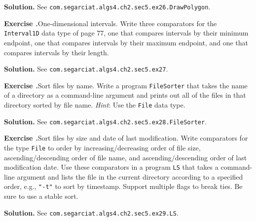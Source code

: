\documentclass[12pt, a4paper]{article}
\newenvironment{ex}[2][Exercise]
{\par\medskip\noindent \textbf{#1 #2.}}
{\medskip}
\newenvironment{sol}[1][Solution]
{\par\medskip\noindent \textbf{#1.} }
{\medskip}
\begin{document}
	\begin{sol}
		See \texttt{com.segarciat.algs4.ch2.sec5.ex26.DrawPolygon}.
	\end{sol}
	\begin{ex}{27}
		\emph{One-dimensional intervals}. Write three comparators for the \texttt{Interval1D}
		data type of page 77, one that compares intervals by their minimum endpoint, one that
		compares intervals by their maximum endpoint, and one that compares intervals by
		their length.
	\end{ex}
	\begin{sol}
		See \texttt{com.segarciat.algs4.ch2.sec5.ex27}.
	\end{sol}
	\begin{ex}{28}
		\emph{Sort files by name}. Write a program \texttt{FileSorter} that takes
		the name of a directory as a command-line argument and prints out all of the files
		in that directory sorted by file name. \emph{Hint}: Use the \texttt{File} data type.
	\end{ex}
	\begin{sol}
		See \texttt{com.segarciat.algs4.ch2.sec5.ex28.FileSorter}.
	\end{sol}
	\begin{ex}{29}
		\emph{Sort files by size and date of last modification}. Write comparators for the
		type \texttt{File} to order by increasing/decreasing order of file size,
		ascending/descending order of file name, and ascending/descending order of last
		modification date. Use these comparators in a program \texttt{LS} that
		takes a command-line argument and lists the file in the current directory according
		to a specified order, e.g., \texttt{"-t"} to sort by timestamp. Support multiple
		flags to break ties. Be sure to use a stable sort.
	\end{ex}
	\begin{sol}
		See \texttt{com.segarciat.algs4.ch2.sec5.ex29.LS}.
	\end{sol}
	\pagebreak
	\printbibliography
\end{document}
